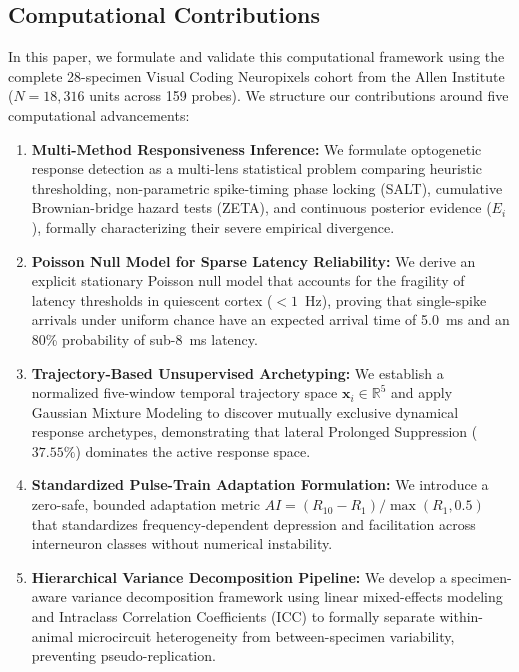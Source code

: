 \documentclass[10pt,journal,compsoc]{IEEEtran}
\begin{document}
\subsection{Computational Contributions}
In this paper, we formulate and validate this computational framework using the complete 28-specimen Visual Coding Neuropixels cohort from the Allen Institute ($N=18,316$ units across 159 probes). We structure our contributions around five computational advancements:
\begin{enumerate}
    \item \textbf{Multi-Method Responsiveness Inference:} We formulate optogenetic response detection as a multi-lens statistical problem comparing heuristic thresholding, non-parametric spike-timing phase locking (SALT), cumulative Brownian-bridge hazard tests (ZETA), and continuous posterior evidence ($E_i$), formally characterizing their severe empirical divergence.
    \item \textbf{Poisson Null Model for Sparse Latency Reliability:} We derive an explicit stationary Poisson null model that accounts for the fragility of latency thresholds in quiescent cortex ($<1$~Hz), proving that single-spike arrivals under uniform chance have an expected arrival time of 5.0~ms and an 80\% probability of sub-8~ms latency.
    \item \textbf{Trajectory-Based Unsupervised Archetyping:} We establish a normalized five-window temporal trajectory space $\mathbf{x}_i \in \mathbb{R}^5$ and apply Gaussian Mixture Modeling to discover mutually exclusive dynamical response archetypes, demonstrating that lateral Prolonged Suppression ($37.55\%$) dominates the active response space.
    \item \textbf{Standardized Pulse-Train Adaptation Formulation:} We introduce a zero-safe, bounded adaptation metric $AI = (R_{10} - R_1)/\max(R_1, 0.5)$ that standardizes frequency-dependent depression and facilitation across interneuron classes without numerical instability.
    \item \textbf{Hierarchical Variance Decomposition Pipeline:} We develop a specimen-aware variance decomposition framework using linear mixed-effects modeling and Intraclass Correlation Coefficients (ICC) to formally separate within-animal microcircuit heterogeneity from between-specimen variability, preventing pseudo-replication.
\end{enumerate}

\end{document}
